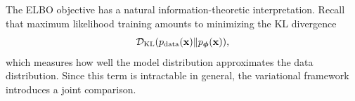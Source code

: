 






The ELBO objective has a natural information-theoretic interpretation. 
Recall that maximum likelihood training amounts to minimizing the KL divergence
\[
\mathcal{D}_{\mathrm{KL}}(p_{\text{data}}({\mathbf{x}}) \| p_{\bm{\phi}}({\mathbf{x}})),
\]
which measures how well the model distribution approximates the data distribution. 
Since this term is intractable in general, the variational framework introduces a joint comparison.

